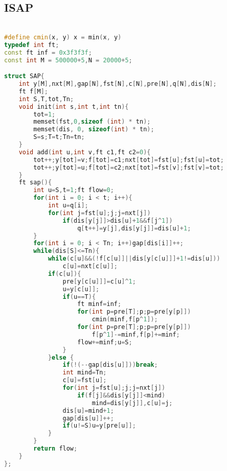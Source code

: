 \subsection{ISAP}
    \paragraph{}
    \begin{lstlisting}[language=C++]

#define cmin(x, y) x = min(x, y)
typedef int ft;
const ft inf = 0x3f3f3f;
const int M = 500000+5,N = 20000+5;

struct SAP{
    int y[M],nxt[M],gap[N],fst[N],c[N],pre[N],q[N],dis[N];
    ft f[M];
    int S,T,tot,Tn;
    void init(int s,int t,int tn){
        tot=1;
        memset(fst,0,sizeof (int) * tn);
        memset(dis, 0, sizeof(int) * tn);
        S=s;T=t;Tn=tn;
    }
    void add(int u,int v,ft c1,ft c2=0){
        tot++;y[tot]=v;f[tot]=c1;nxt[tot]=fst[u];fst[u]=tot;
        tot++;y[tot]=u;f[tot]=c2;nxt[tot]=fst[v];fst[v]=tot;
    }
    ft sap(){
        int u=S,t=1;ft flow=0;
        for(int i = 0; i < t; i++){
            int u=q[i];
            for(int j=fst[u];j;j=nxt[j])
                if(dis[y[j]]>dis[u]+1&&f[j^1])
                    q[t++]=y[j],dis[y[j]]=dis[u]+1;
        }
        for(int i = 0; i < Tn; i++)gap[dis[i]]++;
        while(dis[S]<=Tn){
            while(c[u]&&(!f[c[u]]||dis[y[c[u]]]+1!=dis[u]))
                c[u]=nxt[c[u]];
            if(c[u]){
                pre[y[c[u]]]=c[u]^1;
                u=y[c[u]];
                if(u==T){
                    ft minf=inf;
                    for(int p=pre[T];p;p=pre[y[p]])
                        cmin(minf,f[p^1]);
                    for(int p=pre[T];p;p=pre[y[p]])
                        f[p^1]-=minf,f[p]+=minf;
                    flow+=minf;u=S;
                }
            }else {
                if(!(--gap[dis[u]]))break;
                int mind=Tn;
                c[u]=fst[u];
                for(int j=fst[u];j;j=nxt[j])
                    if(f[j]&&dis[y[j]]<mind)
                        mind=dis[y[j]],c[u]=j;
                dis[u]=mind+1;
                gap[dis[u]]++;
                if(u!=S)u=y[pre[u]];
            }
        }
        return flow;
    }
};

\end{lstlisting}


